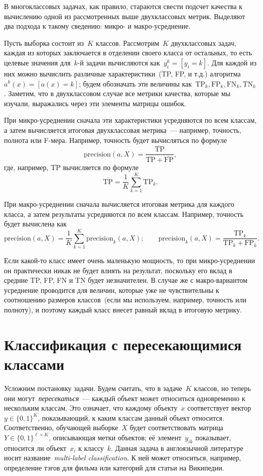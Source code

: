 \documentclass[12pt,fleqn]{article}
\begin{document}
В многоклассовых задачах, как правило, стараются свести подсчет качества
к вычислению одной из рассмотренных выше двухклассовых метрик.
Выделяют два подхода к такому сведению: микро- и макро-усреднение.

Пусть выборка состоит из~$K$ классов.
Рассмотрим~$K$ двухклассовых задач, каждая из которых заключается
в отделении своего класса от остальных, то есть целевые значения
для~$k$-й задачи вычисляются как~$y_i^k = [y_i = k]$.
Для каждой из них можно вычислить различные характеристики~(TP, FP, и т.д.)
алгоритма~$a^k(x) = [a(x) = k]$;
будем обозначать эти величины как~$\text{TP}_k, \text{FP}_k, \text{FN}_k, \text{TN}_k$.
Заметим, что в двухклассовом случае все метрики качества, которые мы изучали,
выражались через эти элементы матрицы ошибок.

При микро-усреднении сначала эти характеристики усредняются по всем классам,
а затем вычисляется итоговая двухклассовая метрика~--- например, точность, полнота или F-мера.
Например, точность будет вычисляться по формуле
\[
    \text{precision}(a, X)
    =
    \frac{
        \overline{\text{TP}}
    }{
        \overline{\text{TP}}
        +
        \overline{\text{FP}}
    },
\]
где, например, $\overline{\text{TP}}$ вычисляется по формуле
\[
    \overline{\text{TP}}
    =
    \frac{1}{K}
    \sum_{k = 1}^{K}
        \text{TP}_k.
\]

При макро-усреднении сначала вычисляется итоговая метрика для каждого класса, а затем результаты
усредняются по всем классам.
Например, точность будет вычислена как
\[
    \text{precision}(a, X)
    =
    \frac{1}{K}
    \sum_{k = 1}^{K}
        \text{precision}_k(a, X);
    \qquad
    \text{precision}_k(a, X)
    =
    \frac{
        \text{TP}_k
    }{
        \text{TP}_k
        +
        \text{FP}_k
    }.
\]

Если какой-то класс имеет очень маленькую мощность, то при микро-усреднении он практически никак не будет
влиять на результат, поскольку его вклад в средние TP, FP, FN и TN будет незначителен.
В случае же с макро-вариантом усреднение проводится для величин,
которые уже не чувствительны к соотношению размеров классов~(если мы используем, например, точность или полноту), и поэтому
каждый класс внесет равный вклад в итоговую метрику.

\section{Классификация с пересекающимися классами}

Усложним постановку задачи.
Будем считать, что в задаче~$K$ классов, но теперь они могут~\emph{пересекаться}~---
каждый объект может относиться одновременно к нескольким классам.
Это означает, что каждому объекту~$x$ соответствует вектор~$y \in \{0, 1\}^K$,
показывающий, к каким классам данный объект относится.
Соответственно, обучающей выборке~$X$ будет соответствовать матрица~$Y \in \{0, 1\}^{\ell \times K}$,
описывающая метки объектов;
её элемент~$y_{ik}$ показывает, относится ли объект~$x_i$ к классу~$k$.
Данная задача в англоязычной литературе носит название~\emph{multi-label classification}.
К ней может относиться, например, определение тэгов для фильма
или категорий для статьи на Википедии.
\end{document}
